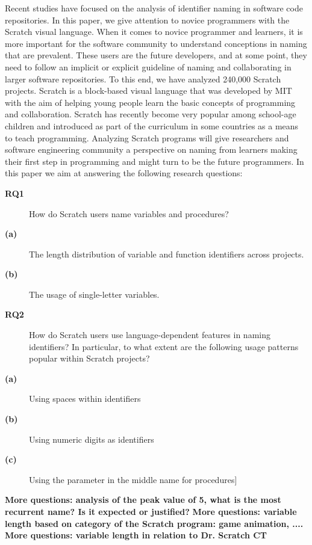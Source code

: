 \documentclass[conference]{IEEEtran}
\newcommand{\todo}[1]{ \textbf{#1} }
\begin{document}
Recent studies have focused on the analysis of identifier naming in software code repositories. 
In this paper, we give attention to novice programmers with the Scratch visual language. 
When it comes to novice programmer and learners, it is more important for the software community to understand conceptions in naming that are prevalent. 
These users are the future developers, and at some point, they need to follow an implicit or explicit guideline of naming and collaborating in larger software repositories. 
To this end, we have analyzed 240,000 Scratch projects. 
Scratch is a block-based visual language that was developed by MIT with the aim of helping young people learn the basic concepts of programming and collaboration.
Scratch has recently become very popular among school-age children and introduced as part of the curriculum in some countries as a means to teach programming. Analyzing Scratch programs will give researchers and software engineering community a perspective on naming from learners making their first step in programming and might turn to be the future programmers. In this paper we aim at answering the following research questions: \\
\begin{description}
	\item[\textbf{RQ1}] How do Scratch users name variables and procedures?
	\item[\textbf{(a)}] The length distribution of variable and function identifiers across projects.
	\item[\textbf{(b)}] The usage of single-letter variables.
	\item[\textbf{RQ2}] How do Scratch users use language-dependent features in naming identifiers? In particular, to what extent are the following usage patterns popular within Scratch projects?
	\item[\textbf{(a)}] Using spaces within identifiers
	\item[\textbf{(b)}] Using numeric digits as identifiers
	\item[\textbf{(c)}] Using the parameter in the middle name for procedures] 
	
\end{description}

\todo{More questions: analysis of the peak value of 5, what is the most recurrent name? Is it expected or justified?}
\todo{More questions: variable length based on category of the Scratch program: game animation, ....}
\todo{More questions: variable length in relation to Dr. Scratch CT}
 
\end{document}
